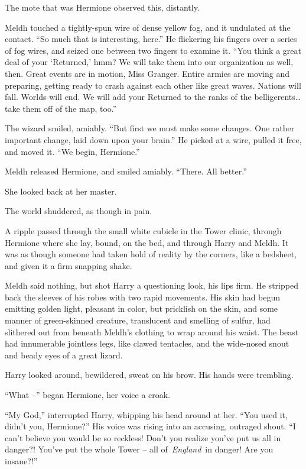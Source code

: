The mote that was Hermione observed this, distantly.

Meldh touched a tightly-spun wire of dense yellow fog, and it undulated
at the contact. ``So much that is interesting, here.'' He flickering his
fingers over a series of fog wires, and seized one between two fingers
to examine it. ``You think a great deal of your `Returned,' hmm? We will
take them into our organization as well, then. Great events are in
motion, Miss Granger. Entire armies are moving and preparing, getting
ready to crash against each other like great waves. Nations will fall.
Worlds will end. We will add your Returned to the ranks of the
belligerents\ldots{} take them off of the map, too.''

The wizard smiled, amiably. ``But first we must make some changes. One
rather important change, laid down upon your brain.'' He picked at a
wire, pulled it free, and moved it. ``We begin, Hermione.''

\mybreak

Meldh released Hermione, and smiled amiably. ``There. All better.''

She looked back at her master.

The world shuddered, as though in pain.

A ripple passed through the small white cubicle in the Tower clinic,
through Hermione where she lay, bound, on the bed, and through Harry and
Meldh. It was as though someone had taken hold of reality by the
corners, like a bedsheet, and given it a firm snapping shake.

Meldh said nothing, but shot Harry a questioning look, his lips firm. He
stripped back the sleeves of his robes with two rapid movements. His
skin had begun emitting golden light, pleasant in color, but pricklish
on the skin, and some manner of green-skinned creature, translucent and
smelling of sulfur, had slithered out from beneath Meldh's clothing to
wrap around his waist. The beast had innumerable jointless legs, like
clawed tentacles, and the wide-nosed snout and beady eyes of a great
lizard.

Harry looked around, bewildered, sweat on his brow. His hands were
trembling.

``What --'' began Hermione, her voice a croak.

``My God,'' interrupted Harry, whipping his head around at her. ``You
used it, didn't you, Hermione?'' His voice was rising into an accusing,
outraged shout. ``I can't believe you would be so reckless! Don't you
realize you've put us all in danger?! You've put the whole Tower -- all
of~\emph{England}~in danger! Are you insane?!''

